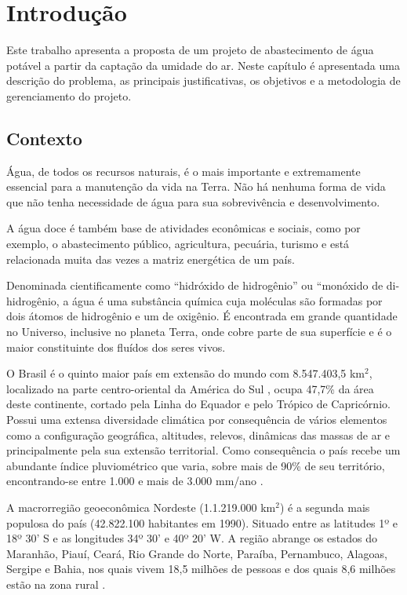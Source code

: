 \chapter{Introdução}

Este trabalho apresenta a proposta de um projeto de abastecimento de água potável a partir da captação da umidade do ar.
Neste capítulo é apresentada uma descrição do problema, as principais justificativas,
os objetivos e a metodologia de gerenciamento do projeto. 

\section{Contexto}

Água, de todos os recursos naturais, é o mais importante e extremamente essencial para a manutenção da vida na Terra.
Não há nenhuma forma de vida que não tenha necessidade de água para sua sobrevivência e desenvolvimento. 

A água doce é também base de atividades econômicas e sociais, como por exemplo, o abastecimento público, agricultura,
pecuária, turismo e está relacionada muita das vezes a matriz energética de um país. 

Denominada cientificamente como “hidróxido de hidrogênio” ou “monóxido de di-hidrogênio, a água é uma substância química
cuja moléculas são formadas por dois átomos de hidrogênio e um de oxigênio. É encontrada em grande quantidade no Universo,
inclusive no planeta Terra, onde cobre parte de sua superfície e é o maior constituinte dos fluídos dos seres vivos. 

O Brasil é o quinto maior país em extensão do mundo com 8.547.403,5 km$^2$,
localizado na parte centro-oriental da América do Sul , ocupa 47,7\%  da área deste continente, cortado pela Linha do Equador
e pelo Trópico de Capricórnio. Possui uma extensa diversidade climática por consequência de vários elementos como a configuração
geográfica, altitudes, relevos, dinâmicas das massas de ar e principalmente pela sua extensão territorial. 
Como consequência o país recebe um abundante índice pluviométrico que varia, sobre mais de 90\% de seu território,
encontrando-se entre 1.000 e mais de 3.000 mm/ano \cite{reboucas03}.

A macrorregião geoeconômica Nordeste (1.1.219.000 km$^2$) é a segunda mais populosa do país (42.822.100 habitantes em 1990). 
Situado entre 	as latitudes 1º e 18º 30’ S e as longitudes 34º 30’ e 40º 20’ W.
A região abrange os estados do Maranhão, Piauí, Ceará, Rio Grande do Norte, Paraíba, Pernambuco, Alagoas, Sergipe e Bahia, nos
quais vivem 18,5 milhões de pessoas e dos quais 8,6 milhões estão na zona rural \cite{cirilo}.

